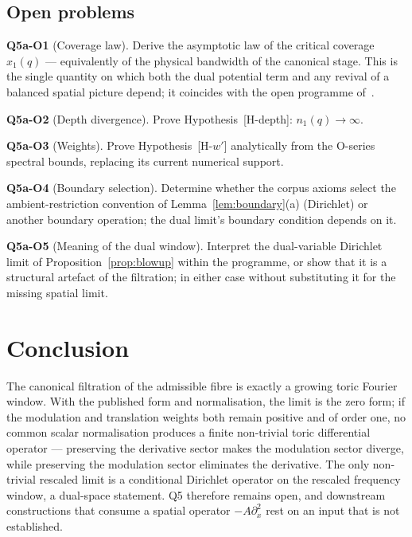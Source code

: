 \documentclass[11pt,a4paper]{article}
\theoremstyle{plain}
\theoremstyle{definition}
\theoremstyle{remark}
\begin{document}
  \subsection{Open problems}

  \noindent\textbf{Q5a-O1} (Coverage law).
  Derive the asymptotic law of the critical coverage $x_1(q)$ --- equivalently of the physical
  bandwidth of the canonical stage.
  This is the single quantity on which both the dual potential term and any revival of a balanced
  spatial picture depend; it coincides with the open programme of~\cite{Beau2026ccnote}.

  \medskip
  \noindent\textbf{Q5a-O2} (Depth divergence).
  Prove Hypothesis~[H-depth]: $n_1(q) \to \infty$.

  \medskip
  \noindent\textbf{Q5a-O3} (Weights).
  Prove Hypothesis~[H-$w'$] analytically from the O-series spectral bounds, replacing its current
  numerical support.

  \medskip
  \noindent\textbf{Q5a-O4} (Boundary selection).
  Determine whether the corpus axioms select the ambient-restriction convention of
  Lemma~\ref{lem:boundary}(a) (Dirichlet) or another boundary operation; the dual limit's boundary
  condition depends on it.

  \medskip
  \noindent\textbf{Q5a-O5} (Meaning of the dual window).
  Interpret the dual-variable Dirichlet limit of Proposition~\ref{prop:blowup} within the programme,
  or show that it is a structural artefact of the filtration; in either case without substituting it
  for the missing spatial limit.

  \section{Conclusion}
  \label{sec:conclusion}

    The canonical filtration of the admissible fibre is exactly a growing toric Fourier window.
    With the published form and normalisation, the limit is the zero form; if the modulation and
    translation weights both remain positive and of order one, no common scalar normalisation produces
    a finite non-trivial toric differential operator --- preserving the derivative sector makes the
    modulation sector diverge, while preserving the modulation sector eliminates the derivative.
    The only non-trivial rescaled limit is a conditional Dirichlet operator on the rescaled frequency
    window, a dual-space statement.
    Q5 therefore remains open, and downstream constructions that consume a spatial operator
    $-A\partial_x^2$ rest on an input that is not established.
\end{document}
